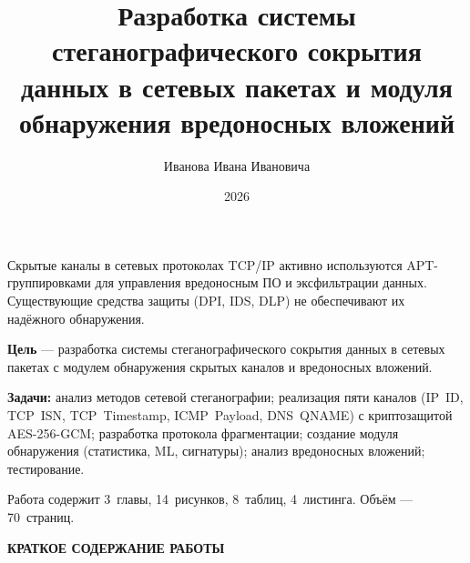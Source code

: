 \documentclass[bachelor, och, autoref]{SCWorks1}
\begin{document}

\title{Разработка системы стеганографического сокрытия данных в сетевых пакетах и модуля обнаружения вредоносных вложений}




\author{Иванова Ивана Ивановича}







\date{2026}

\maketitle


\intro

Скрытые каналы в сетевых протоколах TCP/IP активно используются APT-группировками для управления вредоносным ПО и эксфильтрации данных. Существующие средства защиты (DPI, IDS, DLP) не обеспечивают их надёжного обнаружения.

\textbf{Цель} --- разработка системы стеганографического сокрытия данных в сетевых пакетах с модулем обнаружения скрытых каналов и вредоносных вложений.

\textbf{Задачи:} анализ методов сетевой стеганографии; реализация пяти каналов (IP~ID, TCP~ISN, TCP~Timestamp, ICMP~Payload, DNS~QNAME) с криптозащитой AES-256-GCM; разработка протокола фрагментации; создание модуля обнаружения (статистика, ML, сигнатуры); анализ вредоносных вложений; тестирование.

Работа содержит 3~главы, 14~рисунков, 8~таблиц, 4~листинга. Объём --- 70~страниц.

\centerline{\textbf{КРАТКОЕ СОДЕРЖАНИЕ РАБОТЫ}}
\end{document}
